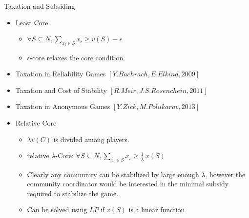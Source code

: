 \documentclass{beamer}
\begin{document}
\begin{frame}{Taxation and Subsiding}
    \begin{itemize}
        \item Least Core
        \begin{itemize}
            \item $\forall S \subseteq N, \sum_{x_i \in S} x_i \geq v(S) - \epsilon$
            \item $\epsilon$-core relaxes the core condition.
        \end{itemize}
        \item Taxation in Reliability Games \small $[Y. Bachrach, E. Elkind, 2009]$

        \item Taxation and Cost of Stability \small $[R. Meir, J. S. Rosenchein, 2011]$

        \item Taxation in Anonymous Games \small $[Y. Zick, M. Polukarov, 2013]$

        \item Relative Core
        \begin{itemize}
            \item $\lambda v(C)$ is divided among players.
            \item relative $\lambda$-Core: $\forall S \subseteq N, \sum_{x_i \in S} x_i \geq \frac{1}{\lambda}.v(S)$            
            \item Clearly any community can be stabilized by large enough $\lambda$, however the community coordinator would be interested in the minimal subsidy required to stabilize the game.
            \item Can be solved using $LP$ if $v(S)$ is a linear function
        \end{itemize}
    \end{itemize}
\end{frame}
\end{document}
